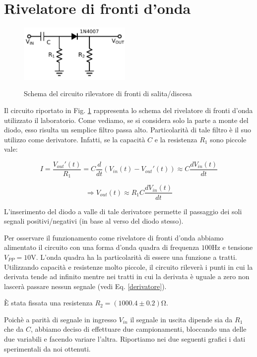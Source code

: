 \section{Rivelatore di fronti d'onda}
\begin{figure}
	\caption{Schema del circuito rilevatore di fronti di salita/discesa}
	\includegraphics[width=54mm]{schema_peak_detector.pdf}
	\label{fig:schema_peak_detector}
\end{figure}

Il circuito riportato in Fig. \ref{fig:schema_peak_detector} rappresenta lo schema del rivelatore di fronti d'onda utilizzato il laboratorio. Come vediamo, se si considera solo la parte a monte del diodo, esso risulta un semplice filtro passa alto. Particolarità di tale filtro è il suo utilizzo come derivatore. Infatti, se la capacità $C$ e la resistenza $R_1$ sono piccole vale:

$$ I=\frac{V_{out}'(t)}{R_1}=C\frac{d}{dt}(V_{in}(t)-V_{out}'(t)) \approx C \frac{dV_{in}(t)}{dt} $$

\begin{equation} 
\Rightarrow V_{out}(t) \approx R_1C \frac{dV_{in}(t)}{dt} 
\label{derivatore}
\end{equation}

L'inserimento del diodo a valle di tale derivatore permette il passaggio dei soli segnali positivi/negativi (in base al verso del diodo stesso).

Per osservare il funzionamento come rivelatore di fronti d'onda abbiamo alimentato il circuito con una forma d'onda quadra di frequenza $100 \si{\hertz}$ e tensione $V_{PP}=10 \si{\volt}$. L'onda quadra ha la particolarità di essere una funzione a tratti. Utilizzando capacità e resistenze molto piccole, il circuito rileverà i punti in cui la derivata tende ad infinito mentre nei tratti in cui la derivata è uguale a zero non lascerà passare nessun segnale (vedi Eq. \ref{derivatore}).

È stata fissata una resistenza $R_2=(1000.4 \pm 0.2) \si{\ohm}$. 

Poichè a parità di segnale in ingresso $V_{in}$ il segnale in uscita dipende sia da $R_1$ che da $C$, abbiamo deciso di effettuare due campionamenti, bloccando una delle due variabili e facendo variare l'altra. Riportiamo nei due seguenti grafici i dati sperimentali da noi ottenuti.

